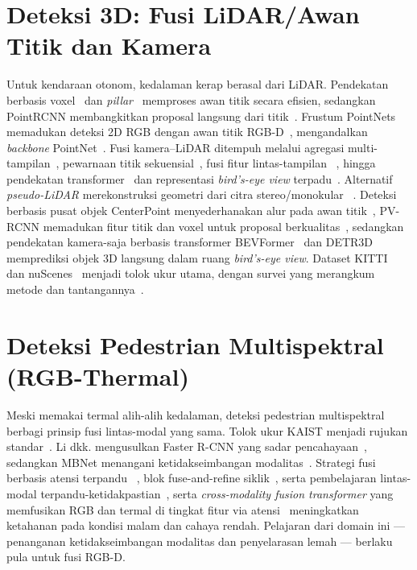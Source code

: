 \documentclass[11pt,a4paper]{article}
\begin{document}
\section{Deteksi 3D: Fusi LiDAR/Awan Titik dan Kamera}
Untuk kendaraan otonom, kedalaman kerap berasal dari LiDAR. Pendekatan berbasis
voxel~\cite{zhou2018voxelnet} dan \emph{pillar}~\cite{lang2019pointpillars}
memproses awan titik secara efisien, sedangkan PointRCNN membangkitkan proposal
langsung dari titik~\cite{shi2019pointrcnn}. Frustum PointNets memadukan deteksi
2D RGB dengan awan titik RGB-D~\cite{qi2018frustum}, mengandalkan
\emph{backbone} PointNet~\cite{qi2017pointnet}. Fusi kamera--LiDAR ditempuh
melalui agregasi multi-tampilan~\cite{chen2017mv3d,ku2018avod}, pewarnaan titik
sekuensial~\cite{vora2020pointpainting}, fusi fitur lintas-tampilan
~\cite{yoo20203dcvf}, hingga pendekatan transformer~\cite{bai2022transfusion} dan
representasi \emph{bird's-eye view} terpadu~\cite{liu2023bevfusion}. Alternatif
\emph{pseudo-LiDAR} merekonstruksi geometri dari citra stereo/monokular
~\cite{wang2019pseudolidar,you2020pseudolidarpp}. Deteksi berbasis pusat objek
CenterPoint menyederhanakan alur pada awan titik~\cite{yin2021centerpoint}, PV-RCNN
memadukan fitur titik dan voxel untuk proposal berkualitas~\cite{shi2020pvrcnn},
sedangkan pendekatan kamera-saja berbasis transformer BEVFormer~\cite{li2022bevformer}
dan DETR3D~\cite{wang2022detr3d} memprediksi objek 3D langsung dalam ruang
\emph{bird's-eye view}. Dataset
KITTI~\cite{geiger2012kitti} dan nuScenes~\cite{caesar2020nuscenes} menjadi tolok
ukur utama, dengan survei yang merangkum metode dan
tantangannya~\cite{arnold2019survey3d,feng2021multimodalsurvey}.

\section{Deteksi Pedestrian Multispektral (RGB-Thermal)}
Meski memakai termal alih-alih kedalaman, deteksi pedestrian multispektral
berbagi prinsip fusi lintas-modal yang sama. Tolok ukur KAIST menjadi rujukan
standar~\cite{hwang2015kaist}. Li dkk. mengusulkan Faster R-CNN yang sadar
pencahayaan~\cite{li2019illumination}, sedangkan MBNet menangani ketidakseimbangan
modalitas~\cite{zhou2020mbnet}. Strategi fusi berbasis atensi terpandu
~\cite{zhang2021gaff}, blok fuse-and-refine siklik~\cite{zhang2020cfr}, serta
pembelajaran lintas-modal terpandu-ketidakpastian~\cite{kim2022cmpd}, serta
\emph{cross-modality fusion transformer} yang memfusikan RGB dan termal di tingkat
fitur via atensi~\cite{fang2022cft} meningkatkan
ketahanan pada kondisi malam dan cahaya rendah. Pelajaran dari domain ini ---
penanganan ketidakseimbangan modalitas dan penyelarasan lemah --- berlaku pula
untuk fusi RGB-D.
\end{document}
